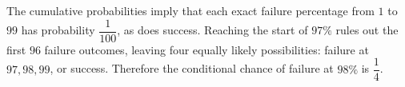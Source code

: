 The cumulative probabilities imply that each exact failure percentage from $1$ to $99$ has probability $\dfrac{1}{100}$, as does success. Reaching the start of $97\%$ rules out the first $96$ failure outcomes, leaving four equally likely possibilities: failure at $97,98,99$, or success. Therefore the conditional chance of failure at $98\%$ is $\boxed{\dfrac{1}{4}}$.

